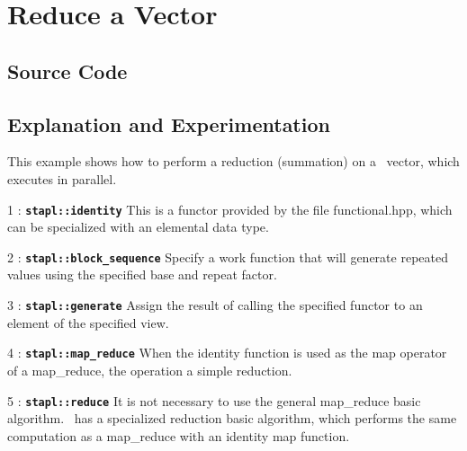 \documentclass{report}
\begin{document}

\pagebreak
\section{Reduce a Vector}

\subsection{Source Code}



\subsection{Explanation and Experimentation}

This example shows how to perform a reduction (summation)
on a \stapl\ vector, which executes in parallel.

\begin{hashitemize}

\item 1 : \texttt{{\bf stapl::identity}}
\newline
This is a functor provided by the file functional.hpp,
which can be specialized with an elemental data type.

\item 2 : \texttt{{\bf stapl::block\_sequence}}
\newline
Specify a work function that will
generate repeated values using the specified base and repeat factor.

\item 3 : \texttt{{\bf stapl::generate}}
\newline
Assign the result of calling the specified functor to an element
of the specified view.

\item 4 : \texttt{{\bf stapl::map\_reduce}}
\newline
When the identity function is used as the map operator of a map\_reduce,
the operation a simple reduction.

\item 5 : \texttt{{\bf stapl::reduce}}
\newline
It is not necessary to use the general map\_reduce basic algorithm.
\stapl\ has a specialized reduction basic algorithm, which performs
the same computation as a map\_reduce with an identity map function.

\end{hashitemize}
\end{document}
